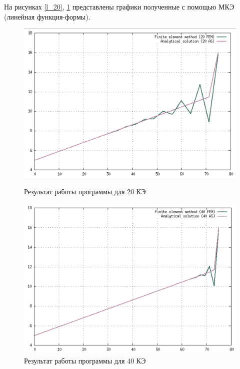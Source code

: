 На рисунках \ref{l_20}, \ref{l_40} представлены графики полученные с помощью МКЭ (линейная функция-формы).

\begin{figure}[!h]
    \centering
    \begin{minipage}{0.5\textwidth}
        \centering
        \includegraphics[width=1\textwidth]{labs/img/lin/20.png} %
        \caption{Результат работы программы для 20 КЭ}
        \label{l_20}
    \end{minipage}\hfill
    \begin{minipage}{0.5\textwidth}
        \centering
        \includegraphics[width=1\textwidth]{labs/img/lin/40.png} %
        \caption{Результат работы программы для 40 КЭ}
        \label{l_40}
    \end{minipage}
\end{figure}

